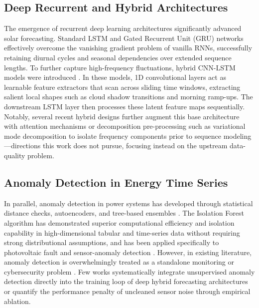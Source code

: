 \documentclass[conference]{IEEEtran}
\begin{document}
\subsection{Deep Recurrent and Hybrid Architectures}
The emergence of recurrent deep learning architectures significantly advanced solar forecasting. Standard LSTM \cite{hochreiter1997lstm} and Gated Recurrent Unit (GRU) networks effectively overcome the vanishing gradient problem of vanilla RNNs, successfully retaining diurnal cycles and seasonal dependencies over extended sequence lengths. To further capture high-frequency fluctuations, hybrid CNN-LSTM models were introduced \cite{zang2020cnnlstm, obiora2021hourly, qu2021dayahead, boucetta2024enhanced, zhou2024enhancing}. In these models, 1D convolutional layers act as learnable feature extractors that scan across sliding time windows, extracting salient local shapes such as cloud shadow transitions and morning ramp-ups. The downstream LSTM layer then processes these latent feature maps sequentially. Notably, several recent hybrid designs further augment this base architecture with attention mechanisms \cite{qu2021dayahead, zhou2024enhancing} or decomposition pre-processing such as variational mode decomposition \cite{boucetta2024enhanced} to isolate frequency components prior to sequence modeling---directions this work does not pursue, focusing instead on the upstream data-quality problem.

\subsection{Anomaly Detection in Energy Time Series}
In parallel, anomaly detection in power systems has developed through statistical distance checks, autoencoders, and tree-based ensembles \cite{zhang2021survey}. The Isolation Forest algorithm \cite{liu2008isolation} has demonstrated superior computational efficiency and isolation capability in high-dimensional tabular and time-series data without requiring strong distributional assumptions, and has been applied specifically to photovoltaic fault and sensor-anomaly detection \cite{jorry2026unsupervised}. However, in existing literature, anomaly detection is overwhelmingly treated as a standalone monitoring or cybersecurity problem \cite{zhang2021survey}. Few works systematically integrate unsupervised anomaly detection directly into the training loop of deep hybrid forecasting architectures or quantify the performance penalty of uncleaned sensor noise through empirical ablation.
\end{document}
